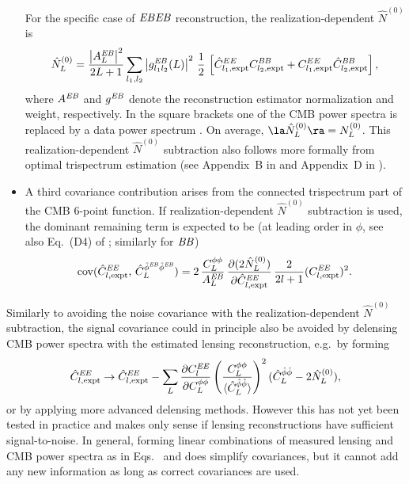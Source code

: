 \begin{itemize}
For the specific case of $\mathit{EB}\mathit{EB}$ reconstruction, the realization-dependent $\hat N^{(0)}$ is 
\begin{align}
  \label{eq:RDN0}
  \hat N^{(0)}_L = \frac{\left|A_L^{\mathit{EB}}\right|^2}{2L+1}\sum_{l_1,l_2} 
\left| g^{\mathit{EB}}_{l_1l_2}(L) \right|^2
\,\frac{1}{2}\,\left[\hat C^{EE}_{l_1,\mathrm{expt}} C^{\mathit{BB}}_{l_2,\mathrm{expt}}+ C^{EE}_{l_1,\mathrm{expt}} \hat C^{\mathit{BB}}_{l_2,\mathrm{expt}}\right],
\end{align}
where $A^{\mathit{EB}}$ and $g^{\mathit{EB}}$ denote the reconstruction estimator normalization and weight, respectively. 
In the square brackets one of the CMB power spectra is replaced by a data power spectrum . On average,  $\la\hat N^{(0)}_L\ra=N^{(0)}_L$.  This realization-dependent $\hat N^{(0)}$ subtraction also follows more formally from optimal trispectrum estimation (see Appendix~B in \cite{marcel1308} and Appendix~D in \cite{Planck2013Lensing}).
\item A third covariance contribution  arises from the connected trispectrum part of the CMB 6-point function. If realization-dependent $\hat N^{(0)}$  subtraction is used, the dominant remaining term is expected to be (at leading order in $\phi$, see also Eq.~(D4) of \cite{marcel1308}; similarly for $\mathit{BB}$)
\begin{align}
  \label{eq:cov_EBEB_EE}
      \mathrm{cov}(\hat C_{l,\mathrm{expt}}^{\mathit{EE}},\, \hat C_L^{\hat\phi^{\mathit{EB}}\hat\phi^{\mathit{EB}}}) = 
2\,\frac{C^{\phi\phi}_L}{A_L^{\mathit{EB}}}\,
\frac{\partial (2\hat N_L^{(0)})}{\partial \hat C^{\mathit{EE}}_{l,\mathrm{expt}}}\,
\frac{2}{2l+1}
(C^{\mathit{EE}}_{l,\mathrm{expt}})^2.
\end{align}

\end{itemize}

Similarly to avoiding the noise covariance with the realization-dependent $\hat N^{(0)}$ subtraction, the signal covariance could in principle also be avoided by delensing CMB power spectra with the estimated lensing reconstruction, e.g.~by forming \cite{marcel1308}
\begin{equation}
  \label{eq:matter_CV_mitigation}
  \hat C^{\mathit{EE}}_{l,\mathrm{expt}} \to  \hat C^{\mathit{EE}}_{l,\mathrm{expt}}- 
\sum_{L} 
 \frac{\partial C_{l}^{\mathit{EE}}}{\partial C_{L}^{\phi\phi}}
\left(\frac{C_{L}^{\phi\phi}}{\langle
\hat{C}_{L}^{\hat{\phi}\hat{\phi}}\rangle}\right)^2
(\hat{C}_{L}^{\hat{\phi}\hat{\phi}}-2\hat{N}_{L}^{(0)}),
\end{equation}
or by applying more advanced delensing methods.  However this has not yet been tested in practice and makes only sense if lensing reconstructions have sufficient signal-to-noise.  In general, forming linear combinations of measured lensing and CMB power spectra as in Eqs.~ and  does simplify covariances, but it cannot add any new information as long as correct covariances are used.



